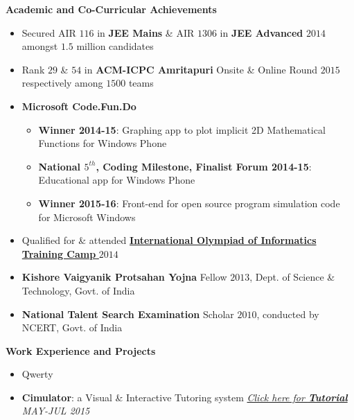 \documentclass[letterpaper,11pt]{article}
\begin{document}
{\Large{\textbf{Academic and Co-Curricular Achievements}}
\normalsize
\\
\vspace{-5pt}
\begin{itemize}
 \item Secured AIR $116$ in \textbf{JEE Mains} \& AIR $1306$ in \textbf{JEE Advanced} $2014$ amongst $1.5$ million candidates
 \vspace{-5pt}
 \item Rank $29$ \& $54$ in \textbf{ACM-ICPC Amritapuri} Onsite \& Online Round $2015$ respectively among $1500$ teams
 \vspace{-5pt}
 \item \textbf{Microsoft Code.Fun.Do}
 \vspace{-5pt}
 \begin{itemize}
 \item \textbf{Winner 2014-15}: Graphing app to plot implicit 2D Mathematical Functions for Windows Phone
 \vspace{-2pt}
 \item \textbf{National $5^{th}$, Coding Milestone, Finalist Forum 2014-15}: Educational app for Windows Phone\\
 \vspace{-2pt}
 \item \textbf{Winner 2015-16}: Front-end for open source program simulation code for Microsoft Windows
 \end{itemize}
 \vspace{-9pt}
 \item Qualified for \& attended \href{http://www.iarcs.org.in/inoi/2014/inoi2014/results_inoi2014.php}{\textbf{International Olympiad of Informatics Training Camp} $2014$}
 \vspace{-5pt}
 \item \textbf{Kishore Vaigyanik Protsahan Yojna} Fellow $2013$, Dept. of Science \& Technology, Govt. of India
 \vspace{-5pt}
 \item \textbf{National Talent Search Examination} Scholar $2010$, conducted by NCERT, Govt. of India
\end{itemize}
\vspace{-4pt}
\Large{\textbf{Work Experience and Projects}}
\normalsize
\vspace{-6pt}
\begin{itemize}
\item Qwerty
  \item \textbf{Cimulator}: a Visual \& Interactive Tutoring system\hspace{0.2in} \href{http://home.iitk.ac.in/~kunalkap/Cimulator.html}{\textit{Click here for \textbf{Tutorial}}} \hfill \textit{MAY-JUL 2015} \\

\end{itemize}}
\end{document}

